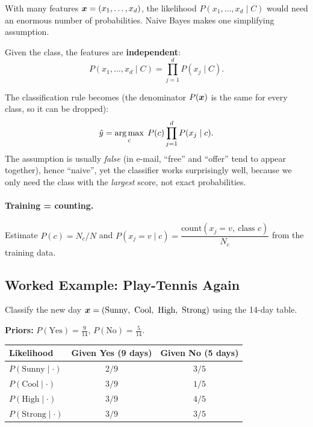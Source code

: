 With many features $\boldsymbol{x}=(x_1,\dots,x_d)$, the likelihood $P(x_1,\dots,x_d\mid C)$ would need an enormous number of probabilities. Naive Bayes makes one simplifying assumption.

\begin{definition}
Given the class, the features are \textbf{independent}:
\[
  P(x_1,\dots,x_d\mid C)=\prod_{j=1}^{d}P(x_j\mid C).
\]
\end{definition}

The classification rule becomes (the denominator $P(\boldsymbol{x})$ is the same for every class, so it can be dropped):
\begin{equation}\label{eq:nb}
  \hat y=\operatorname*{arg\,max}_{c}\; P(c)\prod_{j=1}^{d}P(x_j\mid c).
\end{equation}
The assumption is usually \emph{false} (in e-mail, ``free'' and ``offer'' tend to appear together), hence ``naive'', yet the classifier works surprisingly well, because we only need the class with the \emph{largest} score, not exact probabilities.

\paragraph{Training = counting.} Estimate $P(c)=N_c/N$ and $P(x_j=v\mid c)=\dfrac{\text{count}(x_j=v,\ \text{class }c)}{N_c}$ from the training data.

\subsection{Worked Example: Play-Tennis Again}

Classify the new day $\vect{x}=(\text{Sunny},\ \text{Cool},\ \text{High},\ \text{Strong})$ using the 14-day table.

\textbf{Priors:} $P(\text{Yes})=\tfrac9{14}$, $P(\text{No})=\tfrac5{14}$.

\begin{center}
\begin{tabular}{@{}lcc@{}}
\toprule
\textbf{Likelihood} & \textbf{Given Yes (9 days)} & \textbf{Given No (5 days)}\\
\midrule
$P(\text{Sunny}\mid\cdot)$ & $2/9$ & $3/5$\\
$P(\text{Cool}\mid\cdot)$ & $3/9$ & $1/5$\\
$P(\text{High}\mid\cdot)$ & $3/9$ & $4/5$\\
$P(\text{Strong}\mid\cdot)$ & $3/9$ & $3/5$\\
\bottomrule
\end{tabular}
\end{center}

